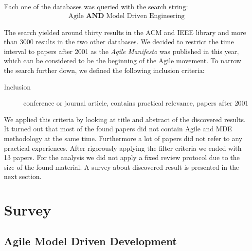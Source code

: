 \documentclass[10pt, a4paper, twocolumn]{article}
\begin{document}
Each one of the databases was queried with the search string:
\begin{align}
	\text{Agile } \textbf{AND} \text{ Model Driven Engineering}
\end{align}

The search yielded around thirty results in the ACM and IEEE library and more than 3000 results in the two other databases. 
We decided to restrict the time interval to papers after 2001 as the \emph{Agile Manifesto} \cite{secondaryAgileManifesto} was published in this year, which can be considered to be the beginning of the Agile movement.
To narrow the search further down, we defined the following inclusion criteria:
\begin{description}
\item[Inclusion] conference or journal article, contains practical relevance, papers after 2001
\end{description}

We applied this criteria by looking at title and abstract of the discovered results. 
It turned out that most of the found papers did not contain Agile and MDE methodology at the same time.
Furthermore a lot of papers did not refer to any practical experiences.
After rigorously applying the filter criteria we ended with 13 papers. 
For the analysis we did not apply a fixed review protocol due to the size of the found material.
A survey about discovered result is presented in the next section.

\section{Survey}

\subsection{Agile Model Driven Development}
\end{document}

